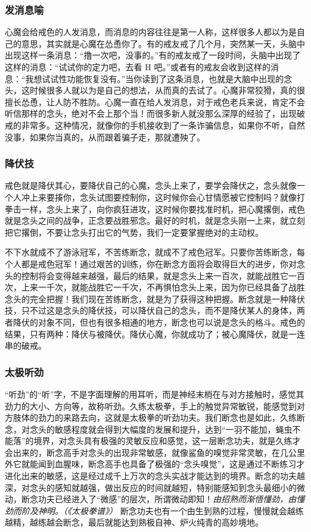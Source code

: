 \subsubsection{发消息喻}

心魔会给戒色的人发消息，而消息的内容往往是第一人称，这样很多人都以为是自己的意思，其实就是心魔在怂恿你了。有的戒友戒了几个月，突然某一天，头脑中出现这样一条消息：“撸一次吧，没事的。”有的戒友戒了一段时间，头脑中出现了这样的消息：“试试你的定力吧，去看 H 吧。”或者有的戒友会收到这样的消息：“我想试试性功能恢复没有。”当你读到了这条消息，也就是大脑中出现的念头，这时候很多人就以为是自己的想法，从而真的去试了。心魔非常狡猾，真的很擅长怂恿，让人防不胜防。心魔一直在给人发消息，对于戒色老兵来说，肯定不会听信那样的念头，绝对不会上那个当！而很多新人就没那么深厚的经验了，出现破戒的非常多。这种情况，就像你的手机接收到了一条诈骗信息，如果你不听，自然没事，如果你当真的，从而跟着骗子走，那就遭殃了。

\subsubsection{降伏技}

戒色就是降伏其心，要降伏自己的心魔，念头上来了，要学会降伏之，念头就像一个人冲上来要揍你，念头试图要控制你，这时候你会心甘情愿被它控制吗？就像打拳击一样，念头上来了，向你疯狂进攻，这时候你要找准时机，把心魔撂倒，戒色就是念头之间的战争，正念要战胜邪念。最好的时机，就是念头刚一上来，就立刻把它撂倒，不要让念头打出它的气势，我们一定要掌握绝对的主动权。

不下水就成不了游泳冠军，不苦练断念，就成不了戒色冠军。只要你苦练断念，每个人都是戒色冠军！通过艰苦的训练，你在断念方面将会取得巨大的进步，你对念头的控制将会变得越来越强，最后的结果，就是念头上来一百次，就能战胜它一百次，上来一千次，就能战胜它一千次，不再惧怕念头上来，因为你已经具备了战胜念头的完全把握！我们现在苦练断念，就是为了获得这种把握。断念就是一种降伏技，只不过这是念头的降伏技，可以降伏自己的念头，而不是降伏某人的身体，两者降伏的对象不同，但也有很多相通的地方，断念也可以说是念头的格斗。戒色的结果，只有两种：降伏与被降伏。降伏心魔，你就成功了；被心魔降伏，就是一连串的破戒。

\subsubsection{太极听劲}

“听劲”的“听”字，不是字面理解的用耳听，而是神经末梢在与对方接触时，感觉其劲力的大小、方向等，故称听劲。久练太极拳，手上的触觉异常敏锐，能感觉到对方肢体的劲力的来路去向，这就是太极拳的听劲功夫。我们断念也是如此，久练断念，对念头的敏感程度就会得到大幅度的发展和提升，达到“一羽不能加，蝇虫不能落”的境界，对念头具有极强的灵敏反应和感觉，这一层断念功夫，就是久练才会出来的，断念高手对念头的出现非常敏感，就像鲨鱼的嗅觉非常灵敏，在几公里外它就能闻到血腥味，断念高手也具备了极强的“念头嗅觉”，这是通过不断练习才进化出来的敏感，这是经过成千上万次的念头实战才能达到的境界。断念的功夫越深，对念头的感知就越强，做出反应的时间就越短，特别能感知到念头最细小的微动，断念功夫已经进入了“微感”的层次，所谓微动即知！\textit{由招熟而渐悟懂劲，由懂劲而阶及神明。（《太极拳谱》）} 断念功夫也有一个由生到熟的过程，慢慢就会越练越精，越练越会断念，最后就能达到熟极自神、炉火纯青的高妙境地。

